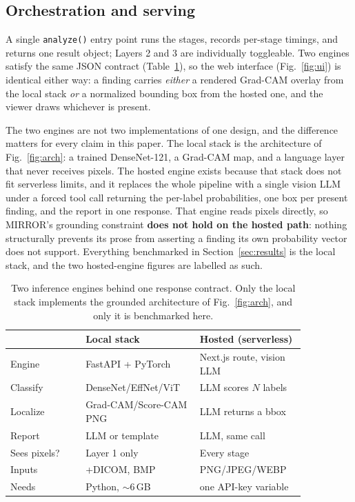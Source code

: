\documentclass[10pt,twocolumn]{article}
\newcommand{\code}[1]{\texttt{\small #1}}
\begin{document}
\subsection{Orchestration and serving}
\label{sec:serving}
A single \code{analyze()} entry point runs the stages, records per-stage timings,
and returns one result object; Layers 2 and 3 are individually toggleable. Two
engines satisfy the same JSON contract (Table~\ref{tab:topology}), so the web
interface (Fig.~\ref{fig:ui}) is identical either way: a finding carries
\emph{either} a rendered Grad-CAM overlay from the local stack \emph{or} a
normalized bounding box from the hosted one, and the viewer draws whichever is
present.

The two engines are not two implementations of one design, and the difference
matters for every claim in this paper. The local stack is the architecture of
Fig.~\ref{fig:arch}: a trained DenseNet-121, a Grad-CAM map, and a language layer
that never receives pixels. The hosted engine exists because that stack does not
fit serverless limits, and it replaces the whole pipeline with a single vision LLM
under a forced tool call returning the per-label probabilities, one box per
present finding, and the report in one response. That engine reads pixels
directly, so MIRROR's grounding constraint \textbf{does not hold on the hosted
path}: nothing structurally prevents its prose from asserting a finding its own
probability vector does not support. Everything benchmarked in
Section~\ref{sec:results} is the local stack, and the two hosted-engine figures
are labelled as such.

\begin{table}[tbp]
\centering
\caption{Two inference engines behind one response contract. Only the local stack
implements the grounded architecture of Fig.~\ref{fig:arch}, and only it is
benchmarked here.}
\label{tab:topology}
\footnotesize
\begin{tabular}{@{}p{0.23\linewidth}%
>{\raggedright\arraybackslash}p{0.32\linewidth}%
>{\raggedright\arraybackslash}p{0.30\linewidth}@{}}
\toprule
 & \textbf{Local stack} & \textbf{Hosted (serverless)} \\
\midrule
Engine        & FastAPI + PyTorch      & Next.js route, vision LLM \\
Classify      & DenseNet/EffNet/ViT    & LLM scores $N$ labels \\
Localize      & Grad-CAM/Score-CAM PNG & LLM returns a bbox \\
Report        & LLM or template        & LLM, same call \\
Sees pixels?  & Layer 1 only           & Every stage \\
Inputs        & \small +DICOM, BMP     & PNG/JPEG/WEBP \\
Needs         & Python, $\sim$6\,GB    & one API-key variable \\
\bottomrule
\end{tabular}
\end{table}
\end{document}

